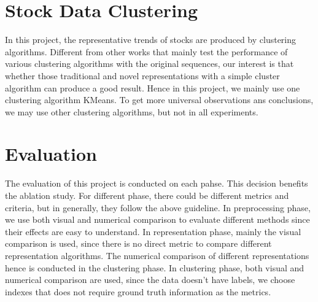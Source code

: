 \section{Stock Data Clustering}
In this project, the representative trends of stocks are produced by clustering algorithms. Different from other works that mainly test the performance of various clustering algorithms with the original sequences, our interest is that whether those traditional and novel representations with a simple cluster algorithm can produce a good result. Hence in this project, we mainly use one clustering algorithm KMeans. To get more universal observations ans conclusions, we may use other clustering algorithms, but not in all experiments.



\section{Evaluation}
\label{sec:Evaluation}
The evaluation of this project is conducted on each pahse. This decision benefits the ablation study. For different phase, there could be different metrics and criteria, but in generally, they follow the above guideline. In preprocessing phase, we use both visual and numerical comparison to evaluate different methods since their effects are easy to understand. In representation phase, mainly the visual comparison is used, since there is no direct metric to compare different representation algorithms. The numerical comparison of different representations hence is conducted in the clustering phase. In clustering phase, both visual and numerical comparison are used, since the data doesn't have labels, we choose indexes that does not require ground truth information as the metrics.